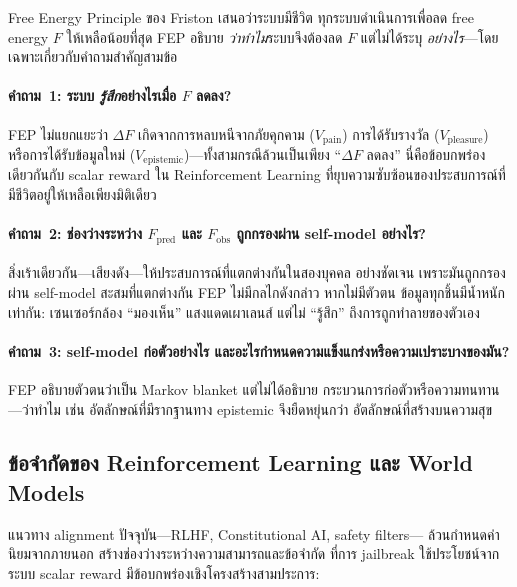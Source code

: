 \documentclass[12pt,a4paper]{article}
\newcommand{\vpain}{V_{\mathrm{pain}}}
\newcommand{\vpleasure}{V_{\mathrm{pleasure}}}
\newcommand{\vepi}{V_{\mathrm{epistemic}}}
\begin{document}
Free Energy Principle ของ Friston \citep[FEP;][]{friston2010} เสนอว่าระบบมีชีวิต
ทุกระบบดำเนินการเพื่อลด free energy $F$ ให้เหลือน้อยที่สุด
FEP อธิบาย \emph{ว่าทำไม}ระบบจึงต้องลด $F$
แต่ไม่ได้ระบุ \emph{อย่างไร}---โดยเฉพาะเกี่ยวกับคำถามสำคัญสามข้อ

\paragraph{คำถาม~1: ระบบ \emph{รู้สึก}อย่างไรเมื่อ $F$ ลดลง?}
FEP ไม่แยกแยะว่า $\Delta F$ เกิดจากการหลบหนีจากภัยคุกคาม
($\vpain$) การได้รับรางวัล ($\vpleasure$) หรือการได้รับข้อมูลใหม่
($\vepi$)---ทั้งสามกรณีล้วนเป็นเพียง ``$\Delta F$ ลดลง''
นี่คือข้อบกพร่องเดียวกันกับ scalar reward ใน Reinforcement Learning
ที่ยุบความซับซ้อนของประสบการณ์ที่มีชีวิตอยู่ให้เหลือเพียงมิติเดียว

\paragraph{คำถาม~2: ช่องว่างระหว่าง $F_{\mathrm{pred}}$ และ
$F_{\mathrm{obs}}$ ถูกกรองผ่าน self-model อย่างไร?}
สิ่งเร้าเดียวกัน---เสียงดัง---ให้ประสบการณ์ที่แตกต่างกันในสองบุคคล
อย่างชัดเจน เพราะมันถูกกรองผ่าน self-model สะสมที่แตกต่างกัน
FEP ไม่มีกลไกดังกล่าว หากไม่มีตัวตน ข้อมูลทุกชิ้นมีน้ำหนักเท่ากัน:
เซนเซอร์กล้อง ``มองเห็น'' แสงแดดเผาเลนส์
แต่ไม่ ``รู้สึก'' ถึงการถูกทำลายของตัวเอง

\paragraph{คำถาม~3: self-model ก่อตัวอย่างไร
และอะไรกำหนดความแข็งแกร่งหรือความเปราะบางของมัน?}
FEP อธิบายตัวตนว่าเป็น Markov blanket แต่ไม่ได้อธิบาย
กระบวนการก่อตัวหรือความทนทาน---ว่าทำไม เช่น
อัตลักษณ์ที่มีรากฐานทาง epistemic จึงยืดหยุ่นกว่า
อัตลักษณ์ที่สร้างบนความสุข

\subsection{ข้อจำกัดของ Reinforcement Learning และ World Models}

แนวทาง alignment ปัจจุบัน---RLHF, Constitutional AI, safety filters---
ล้วนกำหนดค่านิยมจากภายนอก สร้างช่องว่างระหว่างความสามารถและข้อจำกัด
ที่การ jailbreak ใช้ประโยชน์จาก ระบบ scalar reward มีข้อบกพร่องเชิงโครงสร้างสามประการ:
\end{document}

